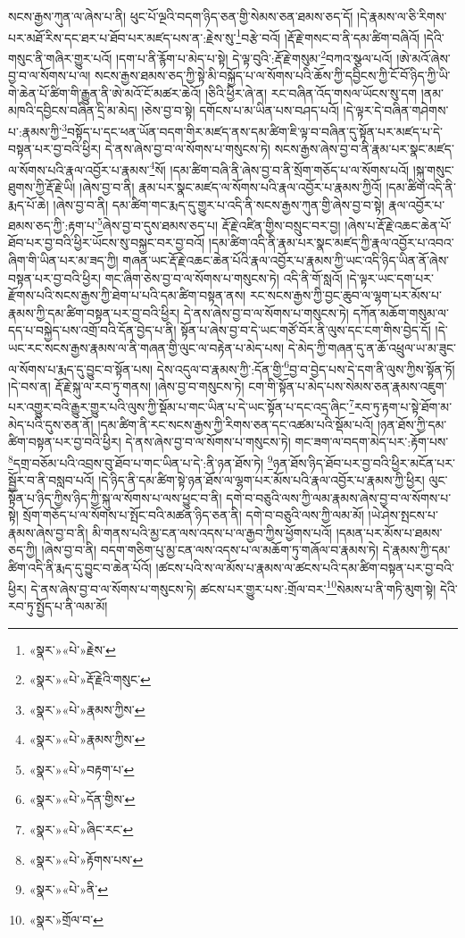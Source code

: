 སངས་རྒྱས་ཀུན་ལ་ཞེས་པ་ནི། ཕུང་པོ་ལྔའི་བདག་ཉིད་ཅན་གྱི་སེམས་ཅན་ཐམས་ཅད་དོ། །དེ་རྣམས་ལ་ཅི་རིགས་པར་མཐོ་རིས་དང་ཐར་པ་ཐོབ་པར་མཛད་པས་ན་:རྗེས་སུ་\footnote{«སྣར་»«པེ་»རྗེས་}བརྩེ་བའོ། །རྡོ་རྗེ་གསང་བ་ནི་དམ་ཚིག་བཞིའོ། །དེའི་གསུང་ནི་གཞིར་གྱུར་པའོ། །དག་པ་ནི་རྙོག་པ་མེད་པ་སྟེ། དེ་ལྟ་བུའི་:རྡོ་རྗེ་གསུམ་\footnote{«སྣར་»«པེ་»རྡོ་རྗེའི་གསུང་}བཀའ་སྩལ་པའོ། །ཨེ་མའོ་ཞེས་བྱ་བ་ལ་སོགས་པ་ལ། སངས་རྒྱས་ཐམས་ཅད་ཀྱི་སྟེ་མི་བསྐྱོད་པ་ལ་སོགས་པའི་ཆོས་ཀྱི་དབྱིངས་ཀྱི་ངོ་བོ་ཉིད་ཀྱི་ཡི་གེ་ཆེན་པོ་ཚིག་གི་རྒྱུན་ནི་ཨེ་མའོ་ངོ་མཚར་ཆེའོ། །ཅིའི་ཕྱིར་ཞེ་ན། རང་བཞིན་འོད་གསལ་ཡོངས་སུ་དག །ནམ་མཁའི་དབྱིངས་བཞིན་དྲི་མ་མེད། །ཅེས་བྱ་བ་སྟེ། དགོངས་པ་མ་ཡིན་པས་བཤད་པའོ། །དེ་ལྟར་དེ་བཞིན་གཤེགས་པ་:རྣམས་ཀྱི་\footnote{«སྣར་»«པེ་»རྣམས་ཀྱིས་}བསྟོད་པ་དང་ཕན་ཡོན་བདག་གིར་མཛད་ནས་དམ་ཚིག་ཇི་ལྟ་བ་བཞིན་དུ་སྟོན་པར་མཛད་པ་དེ་བསྟན་པར་བྱ་བའི་ཕྱིར། དེ་ནས་ཞེས་བྱ་བ་ལ་སོགས་པ་གསུངས་ཏེ། སངས་རྒྱས་ཞེས་བྱ་བ་ནི་རྣམ་པར་སྣང་མཛད་ལ་སོགས་པའི་རྣལ་འབྱོར་པ་རྣམས་\footnote{«སྣར་»«པེ་»རྣམས་ཀྱིས་}སོ། །དམ་ཚིག་བཞི་ནི་ཞེས་བྱ་བ་ནི་སྲོག་གཅོད་པ་ལ་སོགས་པའོ། །སྐུ་གསུང་ཐུགས་ཀྱི་རྡོ་རྗེ་ཡི། །ཞེས་བྱ་བ་ནི། རྣམ་པར་སྣང་མཛད་ལ་སོགས་པའི་རྣལ་འབྱོར་པ་རྣམས་ཀྱིའོ། །དམ་ཚིག་འདི་ནི་རྨད་པོ་ཆེ། །ཞེས་བྱ་བ་ནི། དམ་ཚིག་གང་རྨད་དུ་གྱུར་པ་འདི་ནི་སངས་རྒྱས་ཀུན་གྱི་ཞེས་བྱ་བ་སྟེ། རྣལ་འབྱོར་པ་ཐམས་ཅད་ཀྱི་:རྟག་པ་\footnote{«སྣར་»«པེ་»བརྟག་པ་}ཞེས་བྱ་བ་དུས་ཐམས་ཅད་པ། རྡོ་རྗེ་འཛིན་གྱིས་བསྲུང་བར་བྱ། །ཞེས་པ་རྡོ་རྗེ་འཆང་ཆེན་པོ་ཐོབ་པར་བྱ་བའི་ཕྱིར་ཡོངས་སུ་བསྐྱང་བར་བྱ་བའོ། །དམ་ཚིག་འདི་ནི་རྣམ་པར་སྣང་མཛད་ཀྱི་རྣལ་འབྱོར་པ་འབའ་ཞིག་གི་ཡིན་པར་མ་ཟད་ཀྱི། གཞན་ཡང་རྡོ་རྗེ་འཆང་ཆེན་པོའི་རྣལ་འབྱོར་པ་རྣམས་ཀྱི་ཡང་འདི་ཉིད་ཡིན་ནོ་ཞེས་བསྟན་པར་བྱ་བའི་ཕྱིར། གང་ཞིག་ཅེས་བྱ་བ་ལ་སོགས་པ་གསུངས་ཏེ། འདི་ནི་གོ་སླའོ། །དེ་ལྟར་ཡང་དག་པར་རྫོགས་པའི་སངས་རྒྱས་ཀྱི་ཐེག་པ་པའི་དམ་ཚིག་བསྟན་ནས། རང་སངས་རྒྱས་ཀྱི་བྱང་ཆུབ་ལ་ལྷག་པར་མོས་པ་རྣམས་ཀྱི་དམ་ཚིག་བསྟན་པར་བྱ་བའི་ཕྱིར། དེ་ནས་ཞེས་བྱ་བ་ལ་སོགས་པ་གསུངས་ཏེ། དཀོན་མཆོག་གསུམ་ལ་དད་པ་བསྐྱེད་པས་འགྲོ་བའི་དོན་བྱེད་པ་ནི། སྟོན་པ་ཞེས་བྱ་བ་དེ་ཡང་གཙོ་བོར་ནི་ལུས་དང་ངག་གིས་བྱེད་དོ། །དེ་ཡང་རང་སངས་རྒྱས་རྣམས་ལ་ནི་གཞན་གྱི་ལུང་ལ་བརྟེན་པ་མེད་པས། དེ་མེད་ཀྱི་གཞན་དུ་ན་ཆོ་འཕྲུལ་ཡ་མ་ཟུང་ལ་སོགས་པ་རྨད་དུ་བྱུང་བ་སྟོན་པས། དེས་འདུལ་བ་རྣམས་ཀྱི་:དོན་གྱི་\footnote{«སྣར་»«པེ་»དོན་གྱིས་}བྱ་བ་བྱེད་པས་དེ་དག་ནི་ལུས་ཀྱིས་སྟོན་ཏོ། །དེ་བས་ན། རྡོ་རྗེ་སྐུ་ལ་རབ་ཏུ་གནས། །ཞེས་བྱ་བ་གསུངས་ཏེ། ངག་གི་སྟོན་པ་མེད་པས་སེམས་ཅན་རྣམས་འཇུག་པར་འགྱུར་བའི་རྒྱུར་གྱུར་པའི་ལུས་ཀྱི་སྡོམ་པ་གང་ཡིན་པ་དེ་ཡང་སྟོན་པ་དང་འདྲ་ཞིང་\footnote{«སྣར་»«པེ་»ཞིང་རང་}རབ་ཏུ་རྟག་པ་སྟེ་ཐོག་མ་མེད་པའི་དུས་ཅན་ནོ། །དམ་ཚིག་ནི་རང་སངས་རྒྱས་ཀྱི་རིགས་ཅན་དང་འཚམ་པའི་སྡོམ་པའོ། །ཉན་ཐོས་ཀྱི་དམ་ཚིག་བསྟན་པར་བྱ་བའི་ཕྱིར། དེ་ནས་ཞེས་བྱ་བ་ལ་སོགས་པ་གསུངས་ཏེ། གང་ཟག་ལ་བདག་མེད་པར་:རྟོག་པས་\footnote{«སྣར་»«པེ་»རྟོགས་པས་}དགྲ་བཅོམ་པའི་འབྲས་བུ་ཐོབ་པ་གང་ཡིན་པ་དེ་:ནི་ཉན་ཐོས་ཏེ། \footnote{«སྣར་»«པེ་»ནི་}ཉན་ཐོས་ཉིད་ཐོབ་པར་བྱ་བའི་ཕྱིར་མངོན་པར་སྦྱོར་བ་ནི་བསླབ་པའོ། །དེ་ཉིད་ནི་དམ་ཚིག་སྟེ་ཉན་ཐོས་ལ་ལྷག་པར་མོས་པའི་རྣལ་འབྱོར་པ་རྣམས་ཀྱི་ཕྱིར། ལུང་སྟོན་པ་ཉིད་ཀྱིས་ཉིད་ཀྱི་སྐུ་ལ་སོགས་པ་ལས་ཕྱུང་བ་ནི། དགེ་བ་བཅུའི་ལས་ཀྱི་ལམ་རྣམས་ཞེས་བྱ་བ་ལ་སོགས་པ་སྟེ། སྲོག་གཅོད་པ་ལ་སོགས་པ་སྤོང་བའི་མཚན་ཉིད་ཅན་ནི། དགེ་བ་བཅུའི་ལས་ཀྱི་ལམ་མོ། །ཡེ་ཤེས་སྤངས་པ་རྣམས་ཞེས་བྱ་བ་ནི། མི་གནས་པའི་མྱ་ངན་ལས་འདས་པ་ལ་རྒྱབ་ཀྱིས་ཕྱོགས་པའོ། །དམན་པར་མོས་པ་ཐམས་ཅད་ཀྱི། །ཞེས་བྱ་བ་ནི། བདག་གཅིག་པུ་མྱ་ངན་ལས་འདས་པ་ལ་མཆོག་ཏུ་གཞོལ་བ་རྣམས་ཏེ། དེ་རྣམས་ཀྱི་དམ་ཚིག་འདི་ནི་རྨད་དུ་བྱུང་བ་ཆེན་པོའོ། །ཚངས་པའི་ས་ལ་མོས་པ་རྣམས་ལ་ཚངས་པའི་དམ་ཚིག་བསྟན་པར་བྱ་བའི་ཕྱིར། དེ་ནས་ཞེས་བྱ་བ་ལ་སོགས་པ་གསུངས་ཏེ། ཚངས་པར་གྱུར་པས་:གྲོལ་བར་\footnote{«སྣར་»གྲོལ་བ་}སེམས་པ་ནི་གཏི་མུག་སྟེ། དེའི་རབ་ཏུ་སྤྱོད་པ་ནི་ལམ་མོ། 